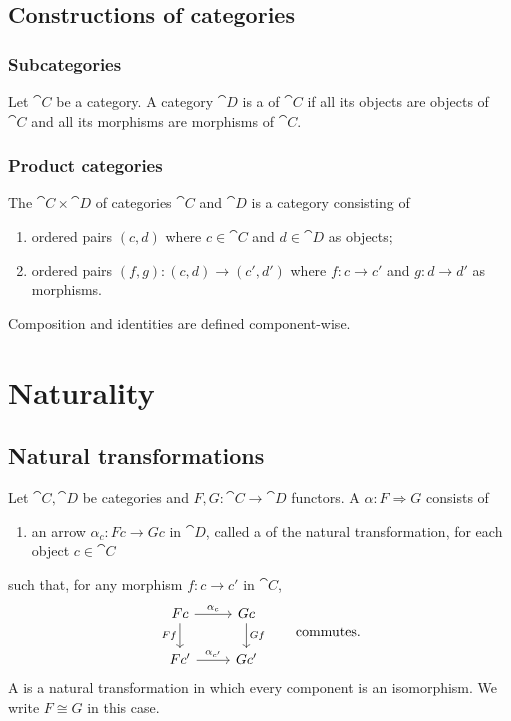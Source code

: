 \subsection{Constructions of categories}
\subsubsection{Subcategories}
\begin{definition}
Let $\cat{C}$ be a category. A category $\cat{D}$ is a  of $\cat{C}$ if all its objects are objects of $\cat{C}$ and all its morphisms are morphisms of $\cat{C}$.
\end{definition}


\subsubsection{Product categories}
\begin{definition}
The  $\cat{C}\times \cat{D}$ of categories $\cat{C}$ and $\cat{D}$  is a category consisting of
\begin{enumerate}
\item ordered pairs $(c,d)$ where $c\in \cat{C}$ and $d\in \cat{D}$ as objects;
\item ordered pairs $(f,g): (c,d) \to (c',d')$ where $f:c\to c'$ and $g:d\to d'$ as morphisms.
\end{enumerate}
Composition and identities are defined component-wise.
\end{definition}



\section{Naturality}
\subsection{Natural transformations}
\begin{definition}
Let $\cat{C}, \cat{D}$ be categories and $F,G: \cat{C}\to \cat{D}$ functors. A  $\alpha: F \Rightarrow G$ consists of
\begin{enumerate}
\item an arrow $\alpha_c: Fc\to Gc$ in $\cat{D}$, called a  of the natural transformation, for each object $c\in \cat{C}$
\end{enumerate}
such that, for any morphism $f:c\to c'$ in $\cat{C}$, 
\[ \begin{tikzcd}
Fc \ar[r, "\alpha_c"] \ar[d, swap, "Ff"] & Gc \ar[d, "Gf"] \\
Fc' \ar[r, "\alpha_{c'}"] & Gc'
\end{tikzcd} \qquad \text{commutes}.\]
A  is a natural transformation in which every component is an isomorphism. We write $F\cong G$ in this case.
\end{definition}

